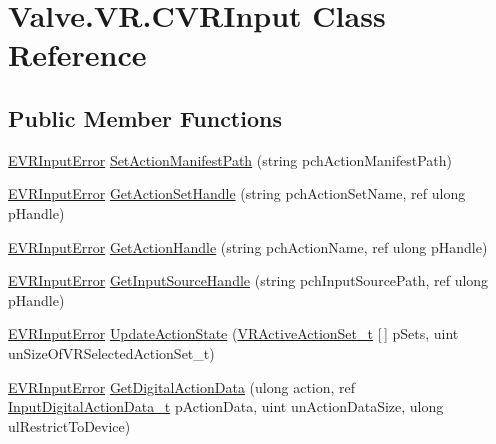 \hypertarget{class_valve_1_1_v_r_1_1_c_v_r_input}{}\section{Valve.\+V\+R.\+C\+V\+R\+Input Class Reference}
\label{class_valve_1_1_v_r_1_1_c_v_r_input}
\subsection*{Public Member Functions}
\begin{DoxyCompactItemize}
\item 
\mbox{\hyperlink{namespace_valve_1_1_v_r_a592d7f4189b8346d6c96dbdbaa35bc1b}{E\+V\+R\+Input\+Error}} \mbox{\hyperlink{class_valve_1_1_v_r_1_1_c_v_r_input_a8d87a662f5616e4861e844b1edbc415d}{Set\+Action\+Manifest\+Path}} (string pch\+Action\+Manifest\+Path)
\item 
\mbox{\hyperlink{namespace_valve_1_1_v_r_a592d7f4189b8346d6c96dbdbaa35bc1b}{E\+V\+R\+Input\+Error}} \mbox{\hyperlink{class_valve_1_1_v_r_1_1_c_v_r_input_acab9fd21a87197d93ad858f568118f68}{Get\+Action\+Set\+Handle}} (string pch\+Action\+Set\+Name, ref ulong p\+Handle)
\item 
\mbox{\hyperlink{namespace_valve_1_1_v_r_a592d7f4189b8346d6c96dbdbaa35bc1b}{E\+V\+R\+Input\+Error}} \mbox{\hyperlink{class_valve_1_1_v_r_1_1_c_v_r_input_a8db69981ead338c62f3955e9b3a1ac66}{Get\+Action\+Handle}} (string pch\+Action\+Name, ref ulong p\+Handle)
\item 
\mbox{\hyperlink{namespace_valve_1_1_v_r_a592d7f4189b8346d6c96dbdbaa35bc1b}{E\+V\+R\+Input\+Error}} \mbox{\hyperlink{class_valve_1_1_v_r_1_1_c_v_r_input_a26142f29606f17823f465e181892a0ab}{Get\+Input\+Source\+Handle}} (string pch\+Input\+Source\+Path, ref ulong p\+Handle)
\item 
\mbox{\hyperlink{namespace_valve_1_1_v_r_a592d7f4189b8346d6c96dbdbaa35bc1b}{E\+V\+R\+Input\+Error}} \mbox{\hyperlink{class_valve_1_1_v_r_1_1_c_v_r_input_a552cd8adc650d99f50401399ec32167c}{Update\+Action\+State}} (\mbox{\hyperlink{struct_valve_1_1_v_r_1_1_v_r_active_action_set__t}{V\+R\+Active\+Action\+Set\+\_\+t}} \mbox{[}$\,$\mbox{]} p\+Sets, uint un\+Size\+Of\+V\+R\+Selected\+Action\+Set\+\_\+t)
\item 
\mbox{\hyperlink{namespace_valve_1_1_v_r_a592d7f4189b8346d6c96dbdbaa35bc1b}{E\+V\+R\+Input\+Error}} \mbox{\hyperlink{class_valve_1_1_v_r_1_1_c_v_r_input_a1b3a25ef4577dfeed2d75eb81424bd5b}{Get\+Digital\+Action\+Data}} (ulong action, ref \mbox{\hyperlink{struct_valve_1_1_v_r_1_1_input_digital_action_data__t}{Input\+Digital\+Action\+Data\+\_\+t}} p\+Action\+Data, uint un\+Action\+Data\+Size, ulong ul\+Restrict\+To\+Device)

\end{DoxyCompactItemize}
